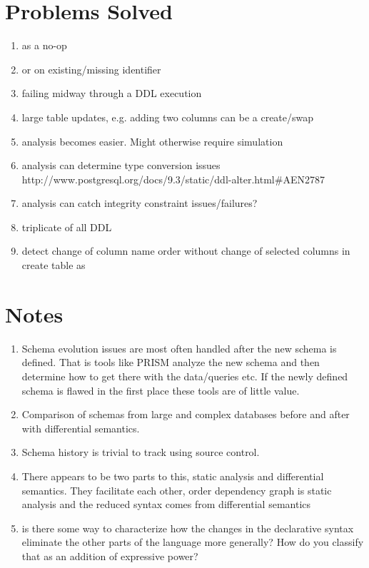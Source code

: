 \documentclass[12pt]{article}
\begin{document}
\newpage

\section{Problems Solved}

\begin{enumerate}
  \item {} as a no-op
  \item {} or  on existing/missing identifier
  \item failing midway through a DDL execution
  \item large table updates, e.g. adding two columns can be a create/swap
  \item analysis becomes easier. Might otherwise require simulation
  \item analysis can determine type conversion issues http://www.postgresql.org/docs/9.3/static/ddl-alter.html#AEN2787
  \item analysis can catch integrity constraint issues/failures?
  \item triplicate of all DDL
  \item detect change of column name order without change of selected columns in create table as
\end{enumerate}

\section{Notes}

 \begin{enumerate}
  \item Schema evolution issues are most often handled after the new schema is defined. That is tools like PRISM analyze the new schema and then determine how to get there with the data/queries etc. If the newly defined schema is flawed in the first place these tools are of little value.
  \item Comparison of schemas from large and complex databases before and after with differential semantics.
  \item Schema history is trivial to track using source control.
  \item There appears to be two parts to this, static analysis and differential semantics. They facilitate each other, order dependency graph is static analysis and the reduced syntax comes from differential semantics
  \item is there some way to characterize how the changes in the declarative syntax eliminate the other parts of the language more generally? How do you classify that as an addition of expressive power?
\end{enumerate}
\end{document}
